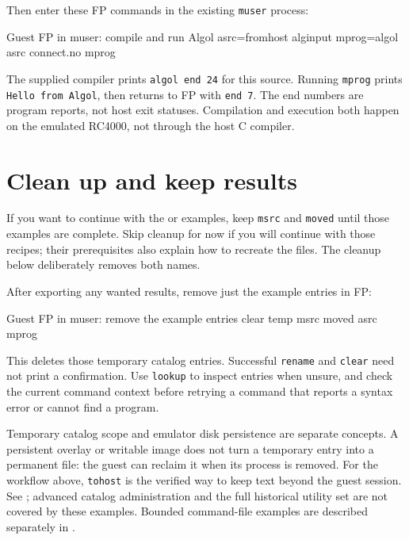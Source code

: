 Then enter these FP commands in the existing \passthrough{\lstinline!muser!} process:

\begin{commandexample}{Guest FP in muser: compile and run Algol}
asrc=fromhost alginput
mprog=algol asrc connect.no
mprog
\end{commandexample}

The supplied compiler prints \passthrough{\lstinline!algol end 24!} for this source. Running \passthrough{\lstinline!mprog!} prints \passthrough{\lstinline!Hello from Algol!}, then returns to FP with \passthrough{\lstinline!end 7!}. The end numbers are program reports, not host exit statuses. Compilation and execution both happen on the emulated RC4000, not through the host C compiler.

\section{Clean up and keep results}\label{clean-up-and-keep-results}

If you want to continue with the
 or
 examples,
keep \passthrough{\lstinline!msrc!} and \passthrough{\lstinline!moved!}
until those examples are complete. Skip cleanup for now if you will continue
with those recipes; their prerequisites also explain how to recreate the files.
The cleanup below deliberately removes both names.

After exporting any wanted results, remove just the example entries in FP:

\begin{commandexample}{Guest FP in muser: remove the example entries}
clear temp msrc moved asrc mprog
\end{commandexample}

This deletes those temporary catalog entries. Successful \passthrough{\lstinline!rename!} and \passthrough{\lstinline!clear!} need not print a confirmation. Use \passthrough{\lstinline!lookup!} to inspect entries when unsure, and check the current command context before retrying a command that reports a syntax error or cannot find a program.

Temporary catalog scope and emulator disk persistence are separate concepts. A persistent overlay or writable image does not turn a temporary entry into a permanent file: the guest can reclaim it when its process is removed. For the workflow above, \passthrough{\lstinline!tohost!} is the verified way to keep text beyond the guest session. See ; advanced catalog administration and the full historical utility set are not covered by these examples. Bounded command-file examples are described separately in .
